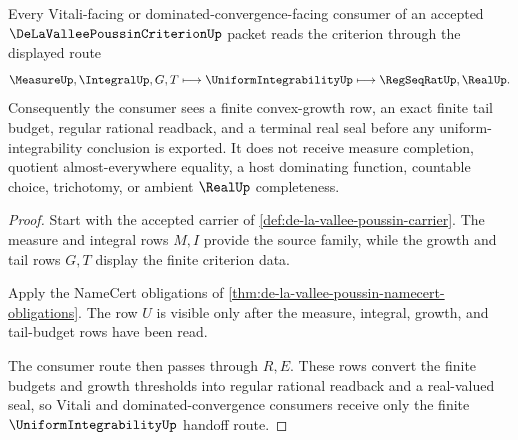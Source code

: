 \begin{theorem}\label{thm:de-la-vallee-poussin-uniform-integrability-route}
Every Vitali-facing or dominated-convergence-facing consumer of an accepted $\DeLaValleePoussinCriterionUp$ packet reads the criterion through the displayed route
$$
\MeasureUp,\IntegralUp,G,T
\longmapsto
\UniformIntegrabilityUp
\longmapsto
\RegSeqRatUp,\RealUp .
$$
Consequently the consumer sees a finite convex-growth row, an exact finite tail budget, regular rational readback, and a terminal real seal before any uniform-integrability conclusion is exported. It does not receive measure completion, quotient almost-everywhere equality, a host dominating function, countable choice, trichotomy, or ambient $\RealUp$ completeness.
\end{theorem}
\begin{proof}
Start with the accepted carrier of \autoref{def:de-la-vallee-poussin-carrier}. The measure and integral rows $M,I$ provide the source family, while the growth and tail rows $G,T$ display the finite criterion data.

Apply the NameCert obligations of \autoref{thm:de-la-vallee-poussin-namecert-obligations}. The row $U$ is visible only after the measure, integral, growth, and tail-budget rows have been read.

The consumer route then passes through $R,E$. These rows convert the finite budgets and growth thresholds into regular rational readback and a real-valued seal, so Vitali and dominated-convergence consumers receive only the finite $\UniformIntegrabilityUp$ handoff route.
\end{proof}


\begin{closurestatus}{\DeLaValleePoussinCriterionUp}
  \theoryclosure{\seedClosure}
  \formalstatus{\unformalizedV}
\end{closurestatus}
